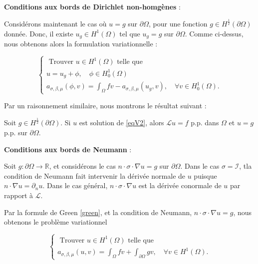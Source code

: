 {\bf Conditions aux bords de Dirichlet non-homgènes }:  

Considérons maintenant le cas où  $u=g$ sur  $\partial \Omega$, pour une fonction  $g\in H^{\frac12}( \partial \Omega )$ donnée. Donc, il existe  $u_{g}\in H^{1}(\Omega)$ tel que  $u_{g}=g$ sur  $\partial \Omega$.    Comme ci-dessus, nous obtenons alors la formulation variationnelle :

\begin{equation}\label{eqV2}
\left\{\begin{array}{l}
	\text { Trouver  } u \in H^{1}(\Omega) \text { telle que } \\
	u=u_{g}+\phi, \quad \phi \in H_{0}^{1}(\Omega) \\
	a_{\sigma, \beta, \mu}(\phi, v)=\int_{\Omega} f v-a_{\sigma, \beta, \mu}\left(u_{g}, v\right), \quad \forall v \in H_{0}^{1}(\Omega).
\end{array}\right.
\end{equation}

Par un raisonnement similaire, nous montrons le résultat suivant :

\begin{proposition}
	
Soit $g \in H^{\frac{1}{2}}(\partial \Omega) .$	Si $u$ est solution de  \eqref{eqV2}, alors  $\mathcal{L} u=f$ p.p. dans  $\Omega$ et  $u=g$ p.p. sur  $\partial \Omega$.
	
\end{proposition}



{\bf Conditions aux bords de Neumann }: 

Soit  $g: \partial \Omega \rightarrow \mathbb{R}$, et considérons le cas  $n \cdot \sigma \cdot \nabla u=g$ sur  $\partial \Omega$. Dans le cas  $\sigma=\mathcal{I}$, tla condition de  Neumann  fait intervenir  la dérivée normale de  $u$ puisque $n \cdot \nabla u=\partial_{n} u$. Dans le cas général, $n \cdot \sigma \cdot \nabla u$ est la dérivée conormale de $u$ par rapport à $\mathcal{L}$.  

Par  la formule de Green \eqref{green},  et la condition de Neumann, $n \cdot \sigma \cdot \nabla u=g$,  nous obtenons le problème variationnel 



\begin{equation}\label{eqv3}
	\left\{\begin{array}{l}
	\text { Trouver  } u \in H^{1}(\Omega) \text { telle que  } \\
	a_{\sigma, \beta, \mu}(u, v)=\int_{\Omega} f v+\int_{\partial \Omega} g v, \quad \forall v \in H^{1}(\Omega).
\end{array}\right.
\end{equation}

